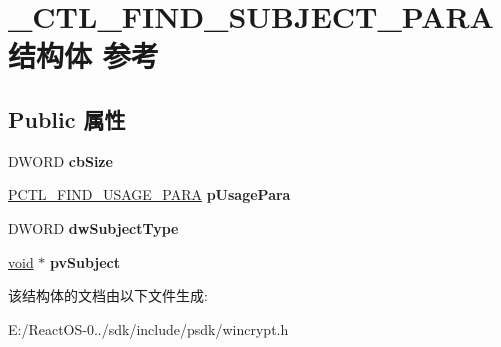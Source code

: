 \hypertarget{struct___c_t_l___f_i_n_d___s_u_b_j_e_c_t___p_a_r_a}{}\section{\+\_\+\+C\+T\+L\+\_\+\+F\+I\+N\+D\+\_\+\+S\+U\+B\+J\+E\+C\+T\+\_\+\+P\+A\+R\+A结构体 参考}
\label{struct___c_t_l___f_i_n_d___s_u_b_j_e_c_t___p_a_r_a}
\subsection*{Public 属性}
\begin{DoxyCompactItemize}
\item 
\mbox{\label{struct___c_t_l___f_i_n_d___s_u_b_j_e_c_t___p_a_r_a_a025e738e462df9c0fd77e7c6b43a21b3}} 
D\+W\+O\+RD {\bfseries cb\+Size}
\item 
\mbox{\label{struct___c_t_l___f_i_n_d___s_u_b_j_e_c_t___p_a_r_a_ace721dfce47a462d1a6d0fb644aa2c06}} 
\hyperlink{struct___c_t_l___f_i_n_d___u_s_a_g_e___p_a_r_a}{P\+C\+T\+L\+\_\+\+F\+I\+N\+D\+\_\+\+U\+S\+A\+G\+E\+\_\+\+P\+A\+RA} {\bfseries p\+Usage\+Para}
\item 
\mbox{\label{struct___c_t_l___f_i_n_d___s_u_b_j_e_c_t___p_a_r_a_a87526e9dd7e1f3d3e8353f3dec6042c3}} 
D\+W\+O\+RD {\bfseries dw\+Subject\+Type}
\item 
\mbox{\label{struct___c_t_l___f_i_n_d___s_u_b_j_e_c_t___p_a_r_a_a4e4c62aa87091661d38b87415f187356}} 
\hyperlink{interfacevoid}{void} $\ast$ {\bfseries pv\+Subject}
\end{DoxyCompactItemize}


该结构体的文档由以下文件生成\+:\begin{DoxyCompactItemize}
\item 
E\+:/\+React\+O\+S-\/0../sdk/include/psdk/wincrypt.\+h\end{DoxyCompactItemize}
